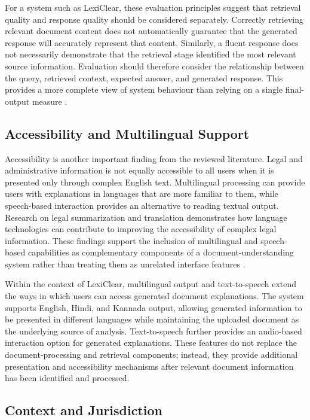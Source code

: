 \documentclass[12pt,a4paper,oneside]{report}
\begin{document}
For a system such as LexiClear, these evaluation principles suggest that
retrieval quality and response quality should be considered separately.
Correctly retrieving relevant document content does not automatically
guarantee that the generated response will accurately represent that content.
Similarly, a fluent response does not necessarily demonstrate that the
retrieval stage identified the most relevant source information. Evaluation
should therefore consider the relationship between the query, retrieved
context, expected answer, and generated response. This provides a more
complete view of system behaviour than relying on a single final-output
measure
\cite{zhang2020bertscore,es2024ragas}.

\subsection{Accessibility and Multilingual Support}

Accessibility is another important finding from the reviewed literature.
Legal and administrative information is not equally accessible to all users
when it is presented only through complex English text. Multilingual
processing can provide users with explanations in languages that are more
familiar to them, while speech-based interaction provides an alternative to
reading textual output. Research on legal summarization and translation
demonstrates how language technologies can contribute to improving the
accessibility of complex legal information. These findings support the
inclusion of multilingual and speech-based capabilities as complementary
components of a document-understanding system rather than treating them as
unrelated interface features
\cite{ash2024translating}.

Within the context of LexiClear, multilingual output and text-to-speech
extend the ways in which users can access generated document explanations.
The system supports English, Hindi, and Kannada output, allowing generated
information to be presented in different languages while maintaining the
uploaded document as the underlying source of analysis. Text-to-speech
further provides an audio-based interaction option for generated
explanations. These features do not replace the document-processing and
retrieval components; instead, they provide additional presentation and
accessibility mechanisms after relevant document information has been
identified and processed.

\subsection{Context and Jurisdiction}
\end{document}
